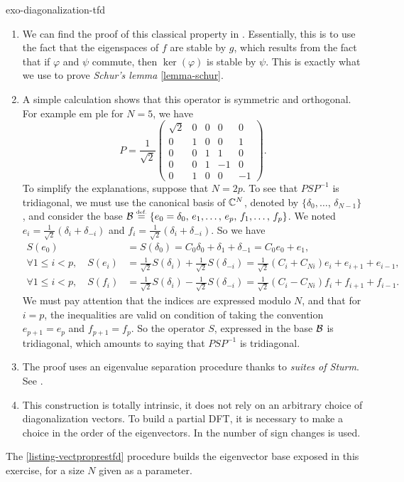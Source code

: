 \begin{correction}{exo-diagonalization-tfd}
\begin{enumerate}
\item {} We can find the proof of this classical property in \cite{ramis-1}. Essentially, this is to use the fact that the eigenspaces of $ f $ are stable by $ g $, which results from the fact that if $ \varphi $ and $ \psi $ commute, then $ \ker (\varphi ) $ is stable by $ \psi $. This is exactly what we use to prove \textit{Schur's lemma} \ref{lemma-schur}.
\item A simple calculation shows that this operator is symmetric and orthogonal. For example \-em \-ple for $ N = 5 $, we have
\begin{equation*}
P = \frac{1}{\sqrt{2}} \begin{pmatrix} \sqrt{2} & 0 & 0 & 0 & 0 \\0 & 1 & 0 & 0 & 1 \\0 & 0 & 1 & 1 & 0 \\0 & 0 & 1 & -1 & 0 \\0 & 1 & 0 & 0 & -1 \end{pmatrix}.
\end{equation*}
To simplify the explanations, suppose that $ N = 2p $. To see that $ PSP^{-1} $ is tridiagonal, we must use the canonical basis of $ \mathbb{C}^N $, denoted by $ \{\delta_0, \ldots, \, \delta_{N-1}\} $ , and consider the base $ \mathcal{B} \stackrel{\mbox{\upshape\tiny def.}}{=} \{e_0 = \delta_0, \, e_1, \ldots, \, e_p, \, f_1, \ldots, \, f_p\} $. We noted $ e_i = \frac{1}{\sqrt{2}} (\delta_i + \delta_{- i}) $ and $ f_i = \frac{1}{\sqrt{2}} (\delta_i + \delta_{- i}) $. So we have
\begin{align*}
S (e_0) & = S (\delta_0) = C_0 \delta_0 + \delta_1 + \delta_{-1} = C_0 e_0 + e_1, \\
\forall 1 \leq i <p, \quad S (e_i) & = \frac{1}{\sqrt{2}} S (\delta_i) + \frac{1}{\sqrt{2}} S (\delta_{- i}) = \frac{1}{\sqrt{2}} (C_i + C_{Ni}) e_i + e_{i+1} + e_{i-1}, \\
\forall 1 \leq i <p, \quad S (f_i) & = \frac{1}{\sqrt{2}} S (\delta_i) - \frac{1}{\sqrt{2}} S (\delta_{- i}) = \frac{1}{\sqrt{2}} (C_i-C_{Ni}) f_i + f_{i+1} + f_{i-1}.
\end{align*}
We must pay attention that the indices are expressed modulo $ N $, and that for $ i = p $, the inequalities are valid on condition of taking the convention $ e_{p+1} = e_p $ and $ f_{p+1} = f_p $. So the operator $ S $, expressed in the base $ \mathcal{B} $ is tridiagonal, which amounts to saying that $ PSP^{-1} $ is tridiagonal.
\item {} The proof uses an eigenvalue separation procedure thanks to \textit{suites of Sturm}. See \cite{ciarlet}.
\item This construction is totally intrinsic, it does not rely on an arbitrary choice of diagonalization vectors. To build a partial DFT, it is necessary to make a choice in the order of the eigenvectors. In \cite{candan-fractional} the number of sign changes is used.
\end{enumerate} The \Matlab{} \ref{listing-vectproprestfd} procedure builds the eigenvector base exposed in this exercise, for a size $ N $ given as a parameter.


\end{correction}

